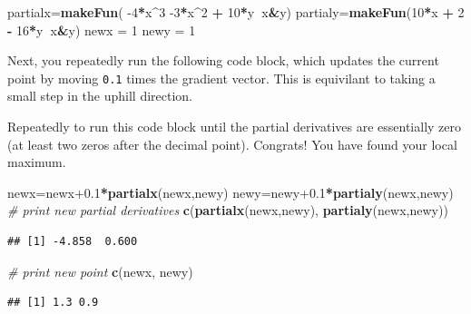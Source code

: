 \documentclass[
]{book}
\newenvironment{Shaded}{\begin{snugshade}}{\end{snugshade}}
\newcommand{\CommentTok}[1]{\textcolor[rgb]{0.56,0.35,0.01}{\textit{#1}}}
\newcommand{\DecValTok}[1]{\textcolor[rgb]{0.00,0.00,0.81}{#1}}
\newcommand{\FloatTok}[1]{\textcolor[rgb]{0.00,0.00,0.81}{#1}}
\newcommand{\KeywordTok}[1]{\textcolor[rgb]{0.13,0.29,0.53}{\textbf{#1}}}
\newcommand{\NormalTok}[1]{#1}
\newcommand{\OperatorTok}[1]{\textcolor[rgb]{0.81,0.36,0.00}{\textbf{#1}}}
\newcommand{\StringTok}[1]{\textcolor[rgb]{0.31,0.60,0.02}{#1}}
\begin{document}
\begin{Shaded}
\begin{Highlighting}[]
\NormalTok{partialx=}\KeywordTok{makeFun}\NormalTok{( }\DecValTok{-4}\OperatorTok{*}\NormalTok{x}\OperatorTok{^}\DecValTok{3} \DecValTok{-3}\OperatorTok{*}\NormalTok{x}\OperatorTok{^}\DecValTok{2} \OperatorTok{+}\StringTok{ }\DecValTok{10}\OperatorTok{*}\NormalTok{y}\OperatorTok{~}\NormalTok{x}\OperatorTok{&}\NormalTok{y)}
\NormalTok{partialy=}\KeywordTok{makeFun}\NormalTok{(}\DecValTok{10}\OperatorTok{*}\NormalTok{x }\OperatorTok{+}\StringTok{ }\DecValTok{2} \OperatorTok{-}\StringTok{ }\DecValTok{16}\OperatorTok{*}\NormalTok{y}\OperatorTok{~}\NormalTok{x}\OperatorTok{&}\NormalTok{y)}
\NormalTok{newx =}\StringTok{ }\DecValTok{1}
\NormalTok{newy =}\StringTok{ }\DecValTok{1}
\end{Highlighting}
\end{Shaded}

Next, you repeatedly run the following code block, which updates the current point by moving \texttt{0.1} times the gradient vector. This is equivilant to taking a small step in the uphill direction.

Repeatedly to run this code block until the partial derivatives are essentially zero (at least two zeros after the decimal point). Congrats! You have found your local maximum.

\begin{Shaded}
\begin{Highlighting}[]
\NormalTok{newx=newx}\FloatTok{+0.1}\OperatorTok{*}\KeywordTok{partialx}\NormalTok{(newx,newy)}
\NormalTok{newy=newy}\FloatTok{+0.1}\OperatorTok{*}\KeywordTok{partialy}\NormalTok{(newx,newy)}
\CommentTok{# print new partial derivatives}
\KeywordTok{c}\NormalTok{(}\KeywordTok{partialx}\NormalTok{(newx,newy), }\KeywordTok{partialy}\NormalTok{(newx,newy))}
\end{Highlighting}
\end{Shaded}

\begin{verbatim}
## [1] -4.858  0.600
\end{verbatim}

\begin{Shaded}
\begin{Highlighting}[]
\CommentTok{# print new point}
\KeywordTok{c}\NormalTok{(newx, newy)}
\end{Highlighting}
\end{Shaded}

\begin{verbatim}
## [1] 1.3 0.9
\end{verbatim}
\end{document}
